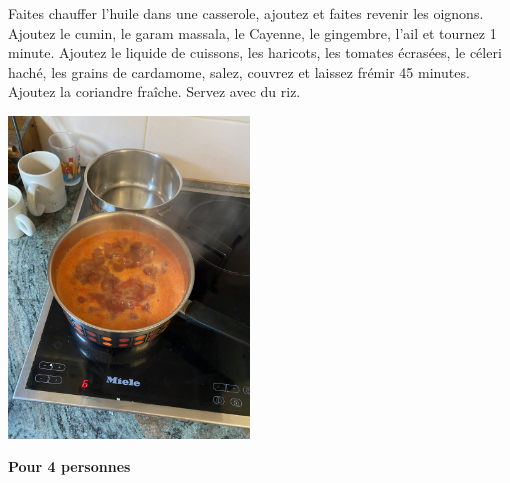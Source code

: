 \documentclass[10pt,a4paper]{report}
\begin{document}
\begin{multicols}{2}
        Faites chauffer l'huile dans une casserole, ajoutez et faites revenir les oignons. Ajoutez le cumin, le garam massala, le Cayenne, le gingembre, l'ail et tournez 1 minute. Ajoutez le liquide de cuissons, les haricots, les tomates écrasées, le céleri haché, les grains de cardamome, salez, couvrez et laissez frémir 45 minutes. Ajoutez la coriandre fraîche. Servez avec du riz.
        \newline
        \newline
        \centerline{\includegraphics[width=0.48\textwidth]{./assets/curry_de_haricots}}
        \newline
        \newline
        \textbf{Pour 4 personnes}
    \end{multicols}
\end{document}

